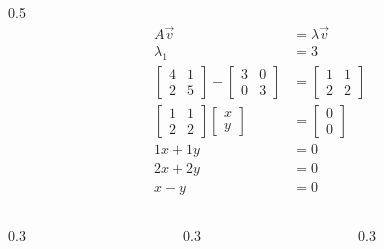 \begin{frame}
\begin{columns}
		\begin{column}{0.5\textwidth}
			\scriptsize{\begin{align}
				A \vec v&=\lambda\vec v \nonumber\\
				\lambda_1&=3 \nonumber\\
				\begin{bmatrix} 4&1\\ 2&5 \end{bmatrix}
					- \begin{bmatrix} 3&0\\ 0&3 \end{bmatrix}
					&= \begin{bmatrix} 1&1\\ 2&2 \end{bmatrix} \\
				\begin{bmatrix} 1&1\\ 2&2 \end{bmatrix}
					\begin{bmatrix} x\\y \end{bmatrix}
					&= \begin{bmatrix} 0\\0 \end{bmatrix} \\
				1x+1y&=0 \\
				2x+2y&=0 \\
				x-y&=0
			\end{align}}
		\end{column}
	\end{columns}

	\begin{columns}
		\begin{column}{0.3\textwidth}
		\end{column}
		\begin{column}{0.3\textwidth}
		\end{column}
		\begin{column}{0.3\textwidth}
		\end{column}

	\end{columns}

\end{frame}

